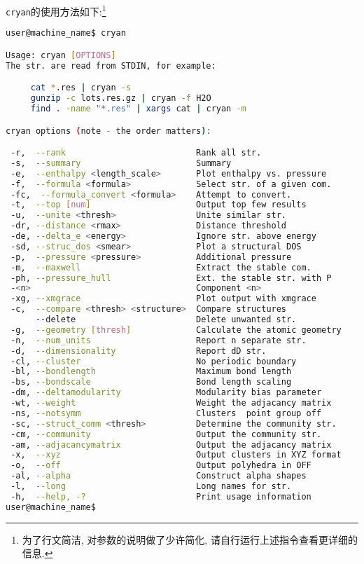 \documentclass[a4paper, 10pt]{article}
\begin{document}
 \verb|cryan|的使用方法如下:\footnote{为了行文简洁, 对参数的说明做了少许简化, 请自行运行上述指令查看更详细的信息.}
\begin{lstlisting}[language={bash}]
user@machine_name$ cryan

Usage: cryan [OPTIONS]
The str. are read from STDIN, for example:

     cat *.res | cryan -s
     gunzip -c lots.res.gz | cryan -f H2O
     find . -name "*.res" | xargs cat | cryan -m

cryan options (note - the order matters):

 -r,  --rank                          Rank all str.
 -s,  --summary                       Summary
 -e,  --enthalpy <length_scale>       Plot enthalpy vs. pressure
 -f,  --formula <formula>             Select str. of a given com.
 -fc,  --formula_convert <formula>    Attempt to convert.
 -t,  --top [num]                     Output top few results
 -u,  --unite <thresh>                Unite similar str.
 -dr, --distance <rmax>               Distance threshold
 -de, --delta_e <energy>              Ignore str. above energy
 -sd, --struc_dos <smear>             Plot a structural DOS
 -p,  --pressure <pressure>           Additional pressure
 -m,  --maxwell                       Extract the stable com.
 -ph, --pressure_hull                 Ext. the stable str. with P
 -<n>                                 Component <n>
 -xg, --xmgrace                       Plot output with xmgrace
 -c,  --compare <thresh> <structure>  Compare structures
      --delete                        Delete unwanted str.
 -g,  --geometry [thresh]             Calculate the atomic geometry
 -n,  --num_units                     Report n separate str.
 -d,  --dimensionality                Report dD str.
 -cl, --cluster                       No periodic boundary
 -bl, --bondlength                    Maximum bond length
 -bs, --bondscale                     Bond length scaling
 -dm, --deltamodularity               Modularity bias parameter
 -wt, --weight                        Weight the adjacancy matrix
 -ns, --notsymm                       Clusters  point group off
 -sc, --struct_comm <thresh>          Determine the community str.
 -cm, --community                     Output the community str.
 -am, --adjacancymatrix               Output the adjacancy matrix
 -x,  --xyz                           Output clusters in XYZ format
 -o,  --off                           Output polyhedra in OFF
 -al, --alpha                         Construct alpha shapes
 -l,  --long                          Long names for str.
 -h,  --help, -?                      Print usage information
user@machine_name$
\end{lstlisting}
\end{document}

